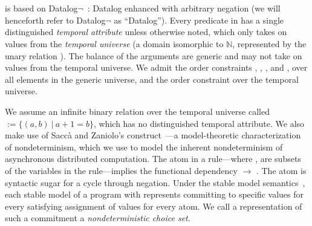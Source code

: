 \section{\large \bf \lang}
\label{sec:foundation}

\lang is based on Datalog$\lnot$~\cite{ullmanbook}: Datalog enhanced with
arbitrary negation (we will henceforth refer to Datalog$\lnot$ as ``Datalog'').
Every predicate in \lang has a single distinguished {\em temporal attribute} unless otherwise noted,
which only takes on values from the {\em temporal universe} (a domain isomorphic to $\mathbb{N}$,
represented by the unary relation ).
The balance of the arguments are generic 
and may not take on values from the temporal universe.  We admit the order constraints \dedalus{<}, \dedalus{=}, \dedalus{!=}, and \dedalus{<=}, over all elements in the generic universe, and the order constraint \dedalus{<} over the temporal universe.

We assume an infinite binary relation over the temporal universe
called  $:= \{(a,b) \ | \ a + 1 = b\}$, which has no
distinguished temporal attribute.  We also make use of Sacc\`{a} and Zaniolo's  construct~\cite{sacca-zaniolo}---a model-theoretic characterization of nondeterminism, which we use to model the inherent nondeterminism of asynchronous distributed computation.  The atom  in a rule---where ,  are subsets of the variables in the rule---implies the functional dependency  $\rightarrow$  .  The  atom is syntactic sugar for a cycle through negation.  Under the stable model semantics~\cite{stable-model}, each stable model of a program with  represents committing to specific  values for every satisfying assignment of  values for every  atom.  We call a representation of such a commitment a {\em nondeterministic choice set}.

